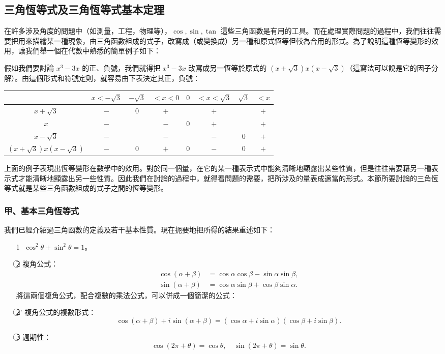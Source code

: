 \subsection{三角恆等式及三角恆等式基本定理}\label{sec:b4s-5-3}

在許多涉及角度的問題中（如測量，工程，物理等），$\cos, \sin, \tan$ 這些三角函數是有用的工具。而在處理實際問題的過程中，我們往往需要把用來描繪某一種現象，由三角函數組成的式子，改寫成（或變換成）另一種和原式恆等但較為合用的形式。為了說明這種恆等變形的效用，讓我們舉一個在代數中熟悉的簡單例子如下：

假如我們要討論 $x^3-3x$ 的正、負號，我們就得把 $x^3-3x$ 改寫成另一恆等於原式的 $(x+\sqrt{3})x(x-\sqrt{3})$（這寫法可以說是它的因子分解）。由這個形式和符號定則，就容易由下表決定其正，負號：

\begin{center}
\begin{tabular}{|c|ccccccc|}
\hline
& $x < -\sqrt{3}$ & $-\sqrt{3}$ & $< x < 0$ & $0$ & $< x < \sqrt{3}$ & $\sqrt{3}$ & $< x$ \\ \hline
$x+\sqrt{3}$ & $-$ & $0$ & $+$ & & $+$ & & $+$ \\
$x$ & $-$ & & $-$ & $0$ & $+$ & & $+$ \\
$x-\sqrt{3}$ & $-$ & & $-$ & & $-$ & $0$ & $+$ \\ \hline
$(x+\sqrt{3})x(x-\sqrt{3})$ & $-$ & $0$ & $+$ & $0$ & $-$ & $0$ & $+$ \\ \hline
\end{tabular}
\end{center}

上面的例子表現出恆等變形在數學中的效用。對於同一個量，在它的某一種表示式中能夠清晰地顯露出某些性質，但是往往需要藉另一種表示式才能清晰地顯露出另一些性質。因此我們在討論的過程中，就得看問題的需要，把所涉及的量表成適當的形式。本節所要討論的三角恆等式就是某些三角函數組成的式子之間的恆等變形。

\subsubsection*{甲、基本三角恆等式}

我們已經介紹過三角函數的定義及若干基本性質。現在扼要地把所得的結果重述如下：
\begin{itemize}
  \item[\textcircled{1}] $\cos^2\theta+\sin^2\theta = 1$。
  \item[\textcircled{2}] 複角公式：
  \begin{align*}
  \cos(\alpha+\beta) &= \cos\alpha\cos\beta - \sin\alpha\sin\beta, \\
  \sin(\alpha+\beta) &= \cos\alpha\sin\beta + \cos\beta\sin\alpha.
  \end{align*}
  將這兩個複角公式，配合複數的乘法公式，可以併成一個簡潔的公式：
  \item[\textcircled{2}'] 複角公式的複數形式：
  \[
  \cos(\alpha+\beta)+i\sin(\alpha+\beta) = (\cos\alpha+i\sin\alpha)(\cos\beta+i\sin\beta).
  \]
  \item[\textcircled{3}] 週期性：
  \[
  \cos(2\pi+\theta) = \cos\theta, \quad \sin(2\pi+\theta) = \sin\theta.
  \]
\end{itemize}

